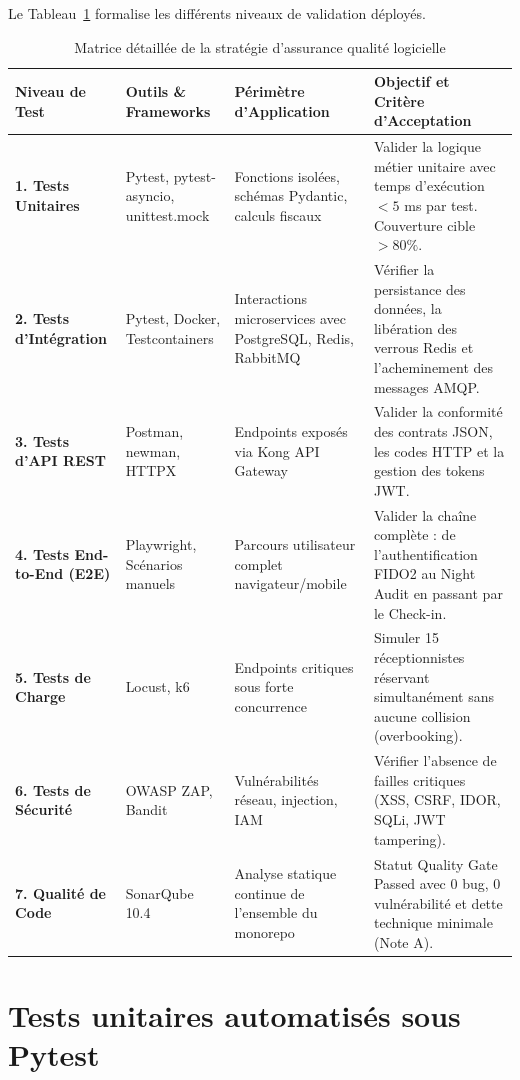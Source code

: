 \documentclass[12pt,a4paper,oneside]{report}
\begin{document}
Le Tableau~\ref{tab:pyramide_tests_detail} formalise les différents niveaux de validation déployés.

\begin{table}[H]
\centering
\small
\renewcommand{\arraystretch}{1.3}
\begin{tabularx}{\textwidth}{|p{3.2cm}|p{2.8cm}|p{3.2cm}|X|}
\hline
\textbf{Niveau de Test} & \textbf{Outils \& Frameworks} & \textbf{Périmètre d'Application} & \textbf{Objectif et Critère d'Acceptation} \\
\hline
\textbf{1. Tests Unitaires} & Pytest, pytest-asyncio, unittest.mock & Fonctions isolées, schémas Pydantic, calculs fiscaux & Valider la logique métier unitaire avec temps d'exécution $< 5$ ms par test. Couverture cible $> 80\%$. \\
\hline
\textbf{2. Tests d'Intégration} & Pytest, Docker, Testcontainers & Interactions microservices avec PostgreSQL, Redis, RabbitMQ & Vérifier la persistance des données, la libération des verrous Redis et l'acheminement des messages AMQP. \\
\hline
\textbf{3. Tests d'API REST} & Postman, newman, HTTPX & Endpoints exposés via Kong API Gateway & Valider la conformité des contrats JSON, les codes HTTP et la gestion des tokens JWT. \\
\hline
\textbf{4. Tests End-to-End (E2E)} & Playwright, Scénarios manuels & Parcours utilisateur complet navigateur/mobile & Valider la chaîne complète : de l'authentification FIDO2 au Night Audit en passant par le Check-in. \\
\hline
\textbf{5. Tests de Charge} & Locust, k6 & Endpoints critiques sous forte concurrence & Simuler 15 réceptionnistes réservant simultanément sans aucune collision (overbooking). \\
\hline
\textbf{6. Tests de Sécurité} & OWASP ZAP, Bandit & Vulnérabilités réseau, injection, IAM & Vérifier l'absence de failles critiques (XSS, CSRF, IDOR, SQLi, JWT tampering). \\
\hline
\textbf{7. Qualité de Code} & SonarQube 10.4 & Analyse statique continue de l'ensemble du monorepo & Statut Quality Gate Passed avec 0 bug, 0 vulnérabilité et dette technique minimale (Note A). \\
\hline
\end{tabularx}
\caption{Matrice détaillée de la stratégie d'assurance qualité logicielle}
\label{tab:pyramide_tests_detail}
\end{table}

\section{Tests unitaires automatisés sous Pytest}
\end{document}
